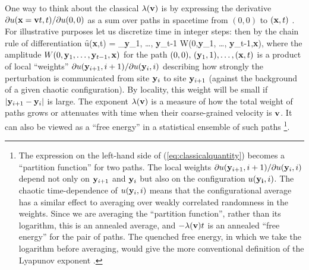 \documentclass[aps,prl,reprint,superscriptaddress, longbibliography]{revtex4-1}
\begin{document}
One way to think about the classical $\lambda({\bf v})$  is by expressing the derivative $\partial u({\bf x}={\bf v}t,t)/\partial{u(0,0)}$ as a sum over paths in spacetime from $(0,0)$ to $({\bf x},t)$ \cite{livi1992scaling,kaneko1992propagation,pikovsky1994roughening}. For illustrative purposes let us discretize time in integer steps: then by the chain rule of differentiation
\be
\f{\partial u({\bf x},t)}{}
=
\sum_{{\bf y}_1, \ldots, {\bf y}_{t-1}} W(0,{\bf y}_1, \ldots, {\bf y}_{t-1},{\bf x}),
\ee
where the amplitude $W(0,{\bf y}_1, \ldots, {\bf y}_{t-1},{\bf x})$ for the path
${(0,0)},\, {({\bf y}_1,1)},  \ldots, {({\bf x},t)}$
 is a product of local ``weights'' 
$\partial u({\bf y}_{i+1}, i+1) / \partial u({\bf y}_{i}, i)$ describing how strongly the perturbation is communicated from site ${\bf y}_i$ to site ${\bf y}_{i+1}$ (against the background of a given chaotic configuration).
By locality, this weight will be small if $|{\bf y}_{i+1}- {\bf y}_i|$ is large.
 The exponent $\lambda({\bf v})$
is a measure of how the total weight of paths grows or attenuates with time when their coarse-grained velocity is ${\bf v}$.
It can also be viewed as a ``free energy'' in a statistical ensemble of such paths \footnote{The expression on the left-hand side of (\ref{eq:classicalquantity}) becomes a ``partition function'' for two paths.
 The local weights $\partial u({\bf y}_{i+1}, i+1) / \partial u({\bf y}_{i}, i)$ depend not only on ${\bf y}_{i+1}$ and ${\bf y}_{i}$ but also on the  configuration $u({\bf y_i},i)$. The chaotic time-dependence of $u({\bf y}_i,i)$ means that the configurational average has a similar effect to averaging over weakly correlated randomness in the weights. Since we are averaging the ``partition function'', rather than its logarithm, this is an annealed average, and $-\lambda({\bf v})t$ is an annealed ``free energy'' for the pair of paths. The quenched free energy, in which we take the logarithm before averaging, would give the more conventional definition of the Lyapunov exponent \cite{livi1992scaling,kaneko1992propagation,pikovsky1994roughening}.}. 
\end{document}
